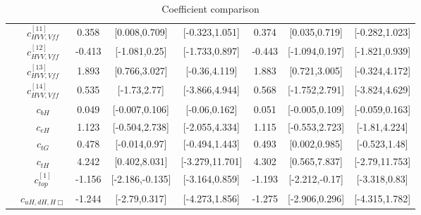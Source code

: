 \documentclass{article}
\begin{document}
\begin{table}[H]
\begin{tabular}{|c|c|c|c|c|c|c|c|}
 & $c_{HVV,Vff}^{[11]}$ & 0.358                             & [0.008,0.709]                                 & [-0.323,1.051] & 0.374                             & [0.035,0.719]                                 & [-0.282,1.023] \\ \cline{2-8}
 & $c_{HVV,Vff}^{[12]}$ & -0.413                             & [-1.081,0.25]                                 & [-1.733,0.897] & -0.443                             & [-1.094,0.197]                                 & [-1.821,0.939] \\ \cline{2-8}
 & $c_{HVV,Vff}^{[13]}$ & 1.893                             & [0.766,3.027]                                 & [-0.36,4.119] & 1.883                             & [0.721,3.005]                                 & [-0.324,4.172] \\ \cline{2-8}
 & $c_{HVV,Vff}^{[14]}$ & 0.535                             & [-1.73,2.77]                                 & [-3.866,4.944] & 0.568                             & [-1.752,2.791]                                 & [-3.824,4.629] \\ \cline{2-8}
 & $c_{bH}$ & 0.049                             & [-0.007,0.106]                                 & [-0.06,0.162] & 0.051                             & [-0.005,0.109]                                 & [-0.059,0.163] \\ \cline{2-8}
 & $c_{eH}$ & 1.123                             & [-0.504,2.738]                                 & [-2.055,4.334] & 1.115                             & [-0.553,2.723]                                 & [-1.81,4.224] \\ \cline{2-8}
 & $c_{tG}$ & 0.478                             & [-0.014,0.97]                                 & [-0.494,1.443] & 0.493                             & [0.002,0.985]                                 & [-0.523,1.48] \\ \cline{2-8}
 & $c_{tH}$ & 4.242                             & [0.402,8.031]                                 & [-3.279,11.701] & 4.302                             & [0.565,7.837]                                 & [-2.79,11.753] \\ \cline{2-8}
 & $c_{top}^{[1]}$ & -1.156                             & [-2.186,-0.135]                                 & [-3.164,0.859] & -1.193                             & [-2.212,-0.17]                                 & [-3.318,0.83] \\ \cline{2-8}
 & $c_{uH,dH,H\Box}$ & -1.244                             & [-2.79,0.317]                                 & [-4.273,1.856] & -1.275                             & [-2.906,0.296]                                 & [-4.315,1.782] \\ \cline{2-8}
\hline
\end{tabular}
\caption{Coefficient comparison}
\end{table}
\end{document}
